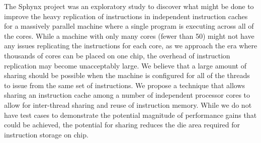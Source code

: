 The Sphynx project was an exploratory study to discover what might be
done to improve the heavy replication of instructions in independent
instruction caches for a massively parallel machine where a single
program is executing across all of the cores. 
While a machine with only many cores (fewer than 50) might not have
any issues replicating the instructions for each core, as we approach
the era where thousands of cores can be placed on one chip, the
overhead of instruction replication may become unacceptably large.
We believe that a large amount of sharing should be possible when the
machine is configured for all of the threads to issue from the same
set of instructions.
We propose a technique that allows sharing an instruction cache among
a number of independent processor cores to allow for inter-thread
sharing and reuse of instruction memory.
While we do not have test cases to demonstrate the potential magnitude
of performance gains that could be achieved, the potential for sharing
reduces the die area required for instruction storage on chip.
